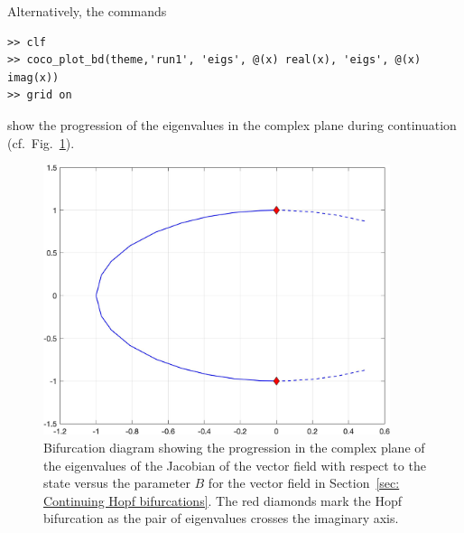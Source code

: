 Alternatively, the commands
\begin{lstlisting}[language=coco-highlight,frame=lines]
>> clf
>> coco_plot_bd(theme,'run1', 'eigs', @(x) real(x), 'eigs', @(x) imag(x))
>> grid on
\end{lstlisting}
show the progression of the eigenvalues in the complex plane during continuation (cf.\ Fig.~\ref{fig: Section5_1_2}).
\begin{figure}[h]
\centering
\includegraphics[width=4in]{Figures/Section5_1_2.jpg}
\caption{Bifurcation diagram showing the progression in the complex plane of the eigenvalues of the Jacobian of the vector field with respect to the state versus the parameter $B$ for the vector field in Section~\ref{sec: Continuing Hopf bifurcations}. The red diamonds mark the Hopf bifurcation as the pair of eigenvalues crosses the imaginary axis.}
\label{fig: Section5_1_2}
\end{figure}

